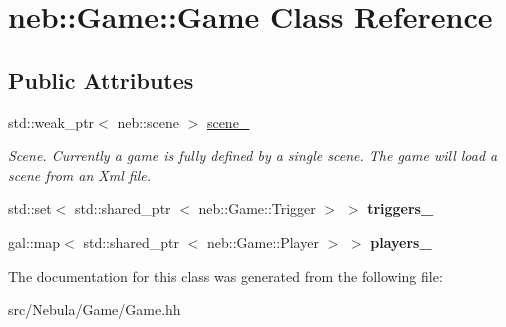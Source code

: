 \hypertarget{classneb_1_1Game_1_1Game}{\section{neb\-:\-:\-Game\-:\-:\-Game \-Class \-Reference}
\label{classneb_1_1Game_1_1Game}
}
\subsection*{\-Public \-Attributes}
\begin{DoxyCompactItemize}
\item 
\hypertarget{classneb_1_1Game_1_1Game_a4f7b6920d5e227713f4fbdac1463cc4a}{std\-::weak\-\_\-ptr$<$ neb\-::scene $>$ \hyperlink{classneb_1_1Game_1_1Game_a4f7b6920d5e227713f4fbdac1463cc4a}{scene\-\_\-}}\label{classneb_1_1Game_1_1Game_a4f7b6920d5e227713f4fbdac1463cc4a}

\begin{DoxyCompactList}\small\item\em \-Scene. \-Currently a game is fully defined by a single scene. \-The game will load a scene from an \-Xml file. \end{DoxyCompactList}\item 
\hypertarget{classneb_1_1Game_1_1Game_aed3384ec204c8b37ac2a2d28f76bc1cd}{std\-::set$<$ std\-::shared\-\_\-ptr\*
$<$ neb\-::\-Game\-::\-Trigger $>$ $>$ {\bfseries triggers\-\_\-}}\label{classneb_1_1Game_1_1Game_aed3384ec204c8b37ac2a2d28f76bc1cd}

\item 
\hypertarget{classneb_1_1Game_1_1Game_a2612d65f68620e6576906ac64609ad5d}{gal\-::map$<$ std\-::shared\-\_\-ptr\*
$<$ neb\-::\-Game\-::\-Player $>$ $>$ {\bfseries players\-\_\-}}\label{classneb_1_1Game_1_1Game_a2612d65f68620e6576906ac64609ad5d}

\end{DoxyCompactItemize}


\-The documentation for this class was generated from the following file\-:\begin{DoxyCompactItemize}
\item 
src/\-Nebula/\-Game/\-Game.\-hh\end{DoxyCompactItemize}
